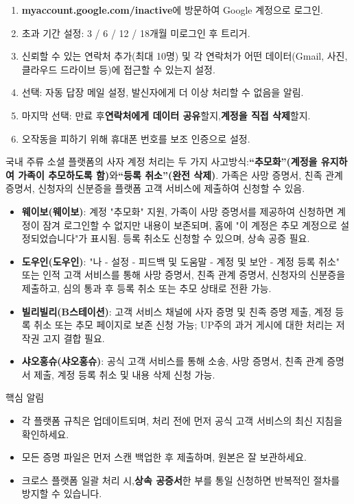 \begin{enumerate}
  \item \textbf{myaccount.google.com/inactive}에 방문하여 Google 계정으로 로그인.
  \item 초과 기간 설정: 3 / 6 / 12 / 18개월 미로그인 후 트리거.
  \item 신뢰할 수 있는 연락처 추가(최대 10명) 및 각 연락처가 어떤 데이터(Gmail, 사진, 클라우드 드라이브 등)에 접근할 수 있는지 설정.
  \item 선택: 자동 답장 메일 설정, 발신자에게 더 이상 처리할 수 없음을 알림.
  \item 마지막 선택: 만료 후\textbf{연락처에게 데이터 공유}할지,\textbf{계정을 직접 삭제}할지.
  \item 오작동을 피하기 위해 휴대폰 번호를 보조 인증으로 설정.
\end{enumerate}


국내 주류 소셜 플랫폼의 사자 계정 처리는 두 가지 사고방식:\textbf{“추모화”(계정을 유지하여 가족이 추모하도록 함)}와\textbf{“등록 취소”(완전 삭제)}. 가족은 사망 증명서, 친족 관계 증명서, 신청자의 신분증을 플랫폼 고객 서비스에 제출하여 신청할 수 있음.

\begin{itemize}
  \item \textbf{웨이보(웨이보)}: 계정 "추모화" 지원, 가족이 사망 증명서를 제공하여 신청하면 계정이 잠겨 로그인할 수 없지만 내용이 보존되며, 홈에 "이 계정은 추모 계정으로 설정되었습니다"가 표시됨. 등록 취소도 신청할 수 있으며, 상속 공증 필요.
  \item \textbf{도우인(도우인)}: "나 - 설정 - 피드백 및 도움말 - 계정 및 보안 - 계정 등록 취소" 또는 인적 고객 서비스를 통해 사망 증명서, 친족 관계 증명서, 신청자의 신분증을 제출하고, 심의 통과 후 등록 취소 또는 추모 상태로 전환 가능.
  \item \textbf{빌리빌리(B스테이션)}: 고객 서비스 채널에 사자 증명 및 친족 증명 제출, 계정 등록 취소 또는 추모 페이지로 보존 신청 가능; UP주의 과거 게시에 대한 처리는 저작권 고지 결합 필요.
  \item \textbf{샤오홍슈(샤오홍슈)}: 공식 고객 서비스를 통해 소송, 사망 증명서, 친족 관계 증명서 제출, 계정 등록 취소 및 내용 삭제 신청 가능.
\end{itemize}

\begin{tcbinfo}{핵심 알림}
\begin{itemize}
  \item 각 플랫폼 규칙은 업데이트되며, 처리 전에 먼저 공식 고객 서비스의 최신 지침을 확인하세요.
  \item 모든 증명 파일은 먼저 스캔 백업한 후 제출하며, 원본은 잘 보관하세요.
  \item 크로스 플랫폼 일괄 처리 시,\textbf{상속 공증서}한 부를 통일 신청하면 반복적인 절차를 방지할 수 있습니다.
\end{itemize}

\end{tcbinfo}

